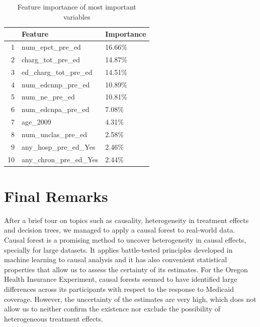 \begin{table}[!ht]
  \centering
  \begin{tabular}{rll}
    \hline
   & Feature & Importance \\ 
    \hline
    1 & num\_epct\_pre\_ed & 16.66\% \\ 
    2 & charg\_tot\_pre\_ed & 14.87\% \\ 
    3 & ed\_charg\_tot\_pre\_ed & 14.51\% \\ 
    4 & num\_edcnnp\_pre\_ed & 10.89\% \\ 
    5 & num\_ne\_pre\_ed & 10.81\% \\ 
    6 & num\_edcnpa\_pre\_ed & 7.08\% \\ 
    7 & age\_2009 & 4.31\% \\ 
    8 & num\_unclas\_pre\_ed & 2.58\% \\ 
    9 & any\_hosp\_pre\_ed\_Yes & 2.46\% \\ 
    10 & any\_chron\_pre\_ed\_Yes & 2.44\% \\ 
     \hline
  \end{tabular}
  
  \caption{\label{tab:feature_importance} Feature importance of most important variables}
  \end{table}

\newpage

\section{Final Remarks}

After a brief tour on topics such as causality, heterogeneity in treatment effects and decision trees, we managed to apply a causal forest to real-world data. Causal forest is a promising method to uncover heterogeneity in causal effects, specially for large datasets. It applies battle-tested principles developed in machine learning to causal analysis and it has also convenient statistical properties that allow us to assess the certainty of its estimates. For the Oregon Health Insurance Experiment, causal forests seemed to have identified large differences across its participants with respect to the response to Medicaid coverage. However, the uncertainty of the estimates are very high, which does not allow us to neither confirm the existence nor exclude the possibility of heterogeneous treatment effects.





% 


